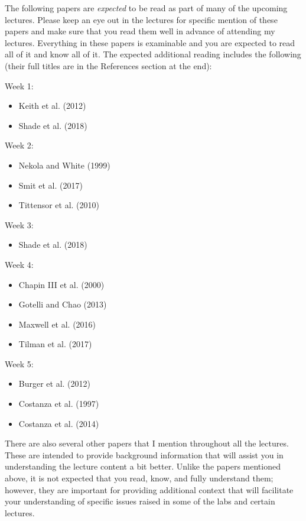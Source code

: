 \documentclass[
  10pt,
]{book}
\providecommand{\tightlist}{%
  \setlength{\itemsep}{0pt}\setlength{\parskip}{0pt}}
\begin{document}
The following papers are \emph{expected} to be read as part of many of
the upcoming lectures. Please keep an eye out in the lectures for
specific mention of these papers and make sure that you read them well
in advance of attending my lectures. Everything in these papers is
examinable and you are expected to read all of it and know all of it.
The expected additional reading includes the following (their full
titles are in the References section at the end):

Week 1:

\begin{itemize}
\tightlist
\item
  Keith et al. (2012)
\item
  Shade et al. (2018)
\end{itemize}

Week 2:

\begin{itemize}
\tightlist
\item
  Nekola and White (1999)
\item
  Smit et al. (2017)
\item
  Tittensor et al. (2010)
\end{itemize}

Week 3:

\begin{itemize}
\tightlist
\item
  Shade et al. (2018)
\end{itemize}

Week 4:

\begin{itemize}
\tightlist
\item
  Chapin III et al. (2000)
\item
  Gotelli and Chao (2013)
\item
  Maxwell et al. (2016)
\item
  Tilman et al. (2017)
\end{itemize}

Week 5:

\begin{itemize}
\tightlist
\item
  Burger et al. (2012)
\item
  Costanza et al. (1997)
\item
  Costanza et al. (2014)
\end{itemize}

There are also several other papers that I mention throughout all the
lectures. These are intended to provide background information that will
assist you in understanding the lecture content a bit better. Unlike the
papers mentioned above, it is not expected that you read, know, and
fully understand them; however, they are important for providing
additional context that will facilitate your understanding of specific
issues raised in some of the labs and certain lectures.
\end{document}
